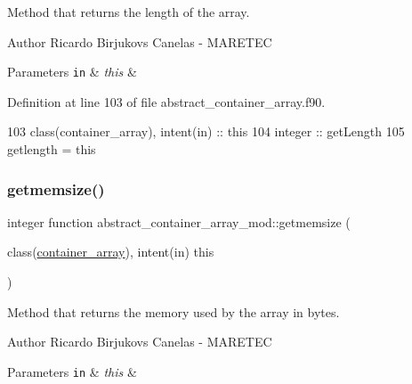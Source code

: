 Method that returns the length of the array. 

\begin{DoxyAuthor}{Author}
Ricardo Birjukovs Canelas -\/ M\+A\+R\+E\+T\+EC 
\end{DoxyAuthor}

\begin{DoxyParams}[1]{Parameters}
\mbox{\tt in}  & {\em this} & \\
\hline
\end{DoxyParams}


Definition at line 103 of file abstract\+\_\+container\+\_\+array.\+f90.


\begin{DoxyCode}
103     \textcolor{keywordtype}{class}(container\_array), \textcolor{keywordtype}{intent(in)} :: this
104     \textcolor{keywordtype}{integer} :: getLength
105     getlength = this%
\end{DoxyCode}
\mbox{\label{namespaceabstract__container__array__mod_a6733f8c7202ec84585ac4f52b6798f02}} 
\subsubsection{\texorpdfstring{getmemsize()}{getmemsize()}}
{\footnotesize\ttfamily integer function abstract\+\_\+container\+\_\+array\+\_\+mod\+::getmemsize (\begin{DoxyParamCaption}\item[{class(\mbox{\hyperlink{structabstract__container__array__mod_1_1container__array}{container\+\_\+array}}), intent(in)}]{this }\end{DoxyParamCaption})\hspace{0.3cm}{\ttfamily [private]}}



Method that returns the memory used by the array in bytes. 

\begin{DoxyAuthor}{Author}
Ricardo Birjukovs Canelas -\/ M\+A\+R\+E\+T\+EC 
\end{DoxyAuthor}

\begin{DoxyParams}[1]{Parameters}
\mbox{\tt in}  & {\em this} & \\
\hline
\end{DoxyParams}


